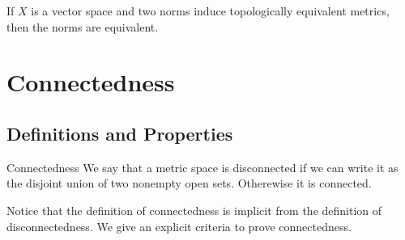 \begin{lmm}{}{} If $X$ is a vector space and two norms induce topologically equivalent metrics, then the norms are equivalent. 
\end{lmm}

\pagebreak
\section{Connectedness}
\subsection{Definitions and Properties}
\begin{defn}{Connectedness}{} We say that a metric space is disconnected if we can write it as the disjoint union of two nonempty open sets. Otherewise it is connected. 
\end{defn}

Notice that the definition of connectedness is implicit from the definition of disconnectedness. We give an explicit criteria to prove connectedness. 

